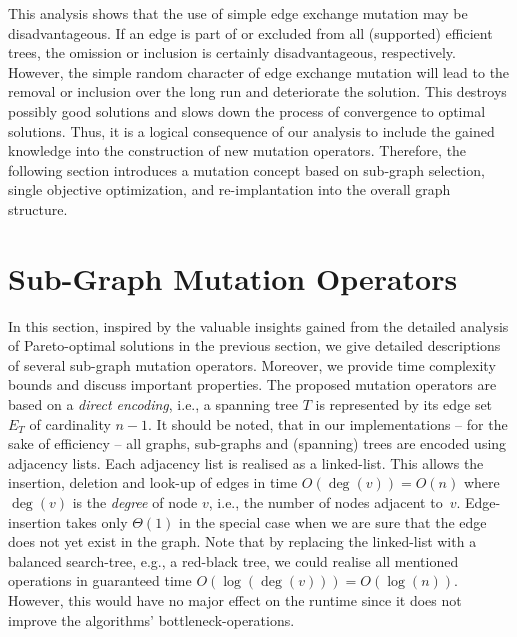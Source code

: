 \documentclass[twoside]{article}
\begin{document}
This analysis shows that the use of simple edge exchange mutation may be disadvantageous. If an edge is part of or excluded from all (supported) efficient trees, the omission or inclusion is certainly disadvantageous, respectively. However, the simple random character of edge exchange mutation will lead to the removal or inclusion over the long run and deteriorate the solution. This destroys possibly good solutions and slows down the process of convergence to optimal solutions. Thus, it is a logical consequence of our analysis to include the gained knowledge into the construction of new mutation operators. 
Therefore, the following section introduces a mutation concept based on sub-graph selection, single objective optimization, and re-implantation into the overall graph structure.



\section{Sub-Graph Mutation Operators}
\label{sec:mutation}

In this section, inspired by the valuable insights gained from the detailed analysis of Pareto-optimal solutions in the previous section, we give detailed descriptions of several sub-graph mutation operators. Moreover, we provide time complexity bounds and discuss important properties. 
The proposed mutation operators are based on a \emph{direct encoding}, i.e., a spanning tree $T$ is represented by its edge set $E_T$ of cardinality $n-1$.
It should be noted, that in our implementations -- for the sake of efficiency -- all graphs, sub-graphs and (spanning) trees are encoded using adjacency lists. Each adjacency list is realised as a linked-list. This allows the insertion, deletion and look-up of edges in time $O(\deg(v)) = O(n)$ where $\deg(v)$ is the \emph{degree} of node $v$, i.e., the number of nodes adjacent to~$v$. Edge-insertion takes only $\Theta(1)$ in the special case when we are sure that the edge does not yet exist in the graph. Note that by replacing the linked-list with a balanced search-tree, e.g., a red-black tree, we could realise all mentioned operations in guaranteed time $O(\log(\deg(v))) = O(\log(n))$. However, this would have no major effect on the runtime since it does not improve the algorithms' bottleneck-operations.
\end{document}
